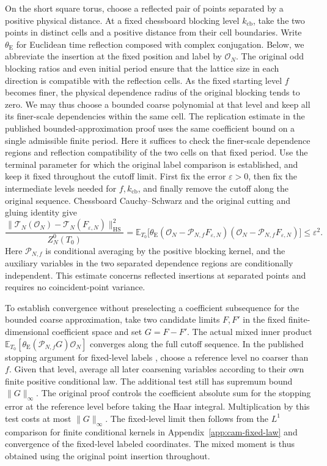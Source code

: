 \documentclass[11pt,a4paper]{article}
\numberwithin{equation}{section}
\newcommand{\HS}{\mathrm{HS}}
\begin{document}
On the short square torus, choose a reflected pair of points separated by a positive physical distance. At a fixed chessboard blocking level \(k_{\mathrm{cb}}\), take the two points in distinct cells and a positive distance from their cell boundaries. Write \(\theta_{\mathrm E}\) for Euclidean time reflection composed with complex conjugation. Below, we abbreviate the insertion at the fixed position and label by \(\mathcal O_N\). The original odd blocking ratios and even initial period ensure that the lattice size in each direction is compatible with the reflection cells. As the fixed starting level \(f\) becomes finer, the physical dependence radius of the original blocking tends to zero. We may thus choose a bounded coarse polynomial at that level and keep all its finer-scale dependencies within the same cell. The replication estimate in the published bounded-approximation proof \cite[Lemmas 14.14 and 14.29, Eq.~(14.54)]{armstrong} uses the same coefficient bound on a single admissible finite period. Here it suffices to check the finer-scale dependence regions and reflection compatibility of the two cells on that fixed period. Use the terminal parameter for which the original label comparison is established, and keep it fixed throughout the cutoff limit. First fix the error \(\varepsilon>0\), then fix the intermediate levels needed for \(f,k_{\mathrm{cb}}\), and finally remove the cutoff along the original sequence. Chessboard Cauchy--Schwarz and the original cutting and gluing identity give
\[
 \frac{\|\mathcal T_N(\mathcal O_N)-\mathcal T_N(F_{\varepsilon,N})\|_{\HS}^2}{Z_N^0(T_0)}
    =
 \mathbb E_{T_0}\bigl[\theta_{\mathrm E}(\mathcal O_N-\mathcal P_{N,f}F_{\varepsilon,N})
                         (\mathcal O_N-\mathcal P_{N,f}F_{\varepsilon,N})\bigr]
       \leq\varepsilon^2 .
\]
Here \(\mathcal P_{N,f}\) is conditional averaging by the positive blocking kernel, and the auxiliary variables in the two separated dependence regions are conditionally independent. This estimate concerns reflected insertions at separated points and requires no coincident-point variance.

To establish convergence without preselecting a coefficient subsequence for the bounded coarse approximation, take two candidate limits \(F,F'\) in the fixed finite-dimensional coefficient space and set \(G=F-F'\). The actual mixed inner product \(\mathbb E_{T_0}[\theta_{\mathrm E}(\mathcal P_{N,f}G)\mathcal O_N]\) converges along the full cutoff sequence. In the published stopping argument for fixed-level labels \cite[Lemmas 14.31--14.32]{armstrong}, choose a reference level no coarser than \(f\). Given that level, average all later coarsening variables according to their own finite positive conditional law. The additional test still has supremum bound \(\|G\|_\infty\). The original proof controls the coefficient absolute sum for the stopping error at the reference level before taking the Haar integral. Multiplication by this test costs at most \(\|G\|_\infty\). The fixed-level limit then follows from the \(L^1\) comparison for finite conditional kernels in Appendix~\ref{app:cam-fixed-law} and convergence of the fixed-level labeled coordinates. The mixed moment is thus obtained using the original point insertion throughout.
\end{document}
